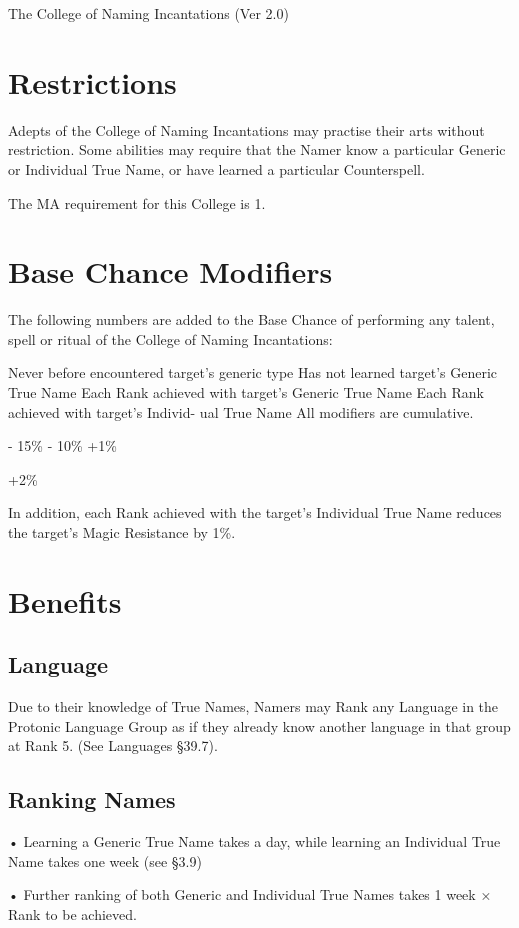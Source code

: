 \begin{Chapter}{The College of Naming Incantations (Ver 2.0)}
\section{Restrictions}

Adepts of the College of Naming Incantations may practise their arts
without restriction.  Some abilities may require that the Namer know a
particular Generic or Individual True Name, or have learned a
particular Counterspell.

The MA requirement for this College is 1. 


\section{Base Chance Modifiers}

The following numbers are added to the Base Chance of performing any
talent, spell or ritual of the College of Naming Incantations:

Never before encountered target’s generic 
type 
Has not learned target’s Generic True 
Name 
Each Rank achieved with target’s Generic 
True Name 
Each Rank achieved with target’s Individ-
ual True Name 
All modifiers are cumulative. 

-
15\%  
-
10\% 
+1\% 

+2\% 

In addition, each Rank achieved with the target’s Individual True Name
reduces the target’s Magic Resistance by 1\%.

\section{Benefits}

\subsection{Language}

Due  to  their  knowledge  of  True  Names,  Namers 
may Rank any Language in the Protonic Language 
Group as if they already know another language in 
that group at Rank 5. (See Languages §39.7). 

\subsection{Ranking Names}

• Learning a Generic True Name takes a day, while 
learning  an  Individual  True  Name  takes  one  week 
(see §3.9)  

•  Further  ranking  of  both  Generic  and  Individual 
True Names takes 1 week × Rank to be achieved.  


\end{Chapter}
